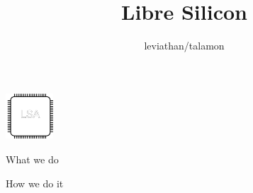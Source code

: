 \documentclass[9pt]{beamer}
\author{leviathan/talamon}
\title{Libre Silicon}
\begin{document}
\begin{frame}
\titlepage
\begin{center}
\includegraphics[width=50pt,height=50pt]{lsa.png}
\end{center}
\end{frame}


\begin{frame}{What we do}

\end{frame}

\begin{frame}{How we do it}

\end{frame}
\end{document}
